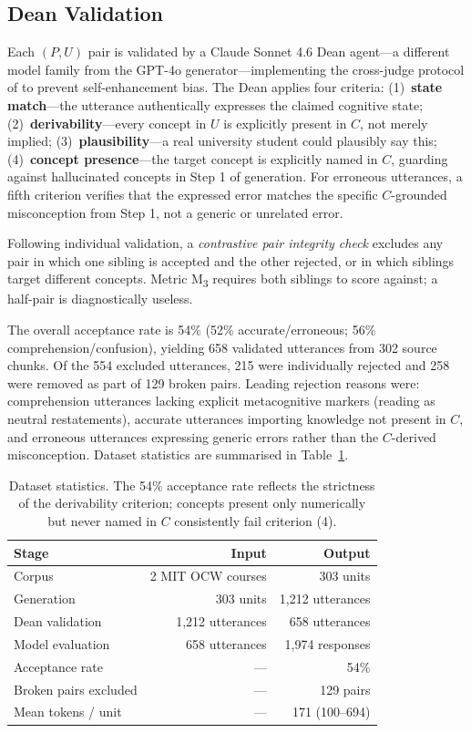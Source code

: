 \documentclass[11pt]{article}
\newcommand{\mthree}{M\textsubscript{3}\xspace}
\begin{document}
\subsection{Dean Validation}

Each $(P, U)$ pair is validated by a Claude Sonnet 4.6 Dean
agent---a different model family from the GPT-4o generator---implementing
the cross-judge protocol of \citet{zheng2024judging} to prevent
self-enhancement bias.
The Dean applies four criteria:
(1)~\textbf{state match}---the utterance authentically expresses the
claimed cognitive state;
(2)~\textbf{derivability}---every concept in $U$ is explicitly present
in $C$, not merely implied;
(3)~\textbf{plausibility}---a real university student could plausibly say
this;
(4)~\textbf{concept presence}---the target concept is explicitly named in $C$,
guarding against hallucinated concepts in Step 1 of generation.
For erroneous utterances, a fifth criterion verifies that the expressed error
matches the specific $C$-grounded misconception from Step 1, not a generic
or unrelated error.

Following individual validation, a \textit{contrastive pair integrity check}
excludes any pair in which one sibling is accepted and the other rejected,
or in which siblings target different concepts.
Metric \mthree requires both siblings to score against; a half-pair is
diagnostically useless.

The overall acceptance rate is 54\% (52\% accurate/erroneous; 56\%
comprehension/confusion), yielding 658 validated utterances from 302
source chunks.
Of the 554 excluded utterances, 215 were individually rejected and 258
were removed as part of 129 broken pairs.
Leading rejection reasons were: comprehension utterances lacking explicit
metacognitive markers (reading as neutral restatements), accurate utterances
importing knowledge not present in $C$, and erroneous utterances expressing
generic errors rather than the $C$-derived misconception.
Dataset statistics are summarised in Table~\ref{tab:dataset}.

\begin{table}[t]
\centering
\small
\begin{tabular}{lrr}
\toprule
\textbf{Stage} & \textbf{Input} & \textbf{Output} \\
\midrule
Corpus & 2 MIT OCW courses & 303 units \\
Generation & 303 units & 1{,}212 utterances \\
Dean validation & 1{,}212 utterances & 658 utterances \\
Model evaluation & 658 utterances & 1{,}974 responses \\
\midrule
Acceptance rate & --- & 54\% \\
Broken pairs excluded & --- & 129 pairs \\
Mean tokens / unit & --- & 171 (100--694) \\
\bottomrule
\end{tabular}
\caption{Dataset statistics. The 54\% acceptance rate reflects the
strictness of the derivability criterion; concepts present only
numerically but never named in $C$ consistently fail criterion (4).}
\label{tab:dataset}
\end{table}
\end{document}
